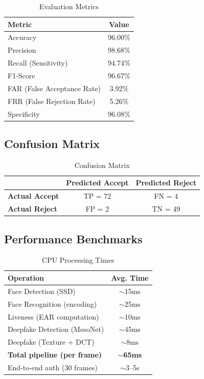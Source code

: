 \documentclass[conference,10pt]{IEEEtran}
\begin{document}
\begin{table}[H]
\centering
\caption{Evaluation Metrics}
\label{tab:metrics}
\begin{tabular}{lc}
\toprule
\textbf{Metric} & \textbf{Value} \\
\midrule
Accuracy & 96.00\% \\
Precision & 98.68\% \\
Recall (Sensitivity) & 94.74\% \\
F1-Score & 96.67\% \\
FAR (False Acceptance Rate) & 3.92\% \\
FRR (False Rejection Rate) & 5.26\% \\
Specificity & 96.08\% \\
\bottomrule
\end{tabular}
\end{table}

\subsection{Confusion Matrix}

\begin{table}[H]
\centering
\caption{Confusion Matrix}
\label{tab:confusion}
\begin{tabular}{lcc}
\toprule
& \textbf{Predicted Accept} & \textbf{Predicted Reject} \\
\midrule
\textbf{Actual Accept} & TP = 72 & FN = 4 \\
\textbf{Actual Reject} & FP = 2 & TN = 49 \\
\bottomrule
\end{tabular}
\end{table}

\subsection{Performance Benchmarks}

\begin{table}[H]
\centering
\caption{CPU Processing Times}
\label{tab:performance}
\begin{tabular}{lc}
\toprule
\textbf{Operation} & \textbf{Avg. Time} \\
\midrule
Face Detection (SSD) & $\sim$15ms \\
Face Recognition (encoding) & $\sim$25ms \\
Liveness (EAR computation) & $\sim$10ms \\
Deepfake Detection (MesoNet) & $\sim$45ms \\
Deepfake (Texture + DCT) & $\sim$8ms \\
\textbf{Total pipeline (per frame)} & \textbf{$\sim$65ms} \\
End-to-end auth (30 frames) & $\sim$3--5s \\
\bottomrule
\end{tabular}
\end{table}
\end{document}
